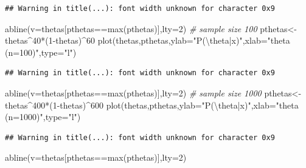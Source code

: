 \documentclass[
]{book}
\newenvironment{Shaded}{\begin{snugshade}}{\end{snugshade}}
\newcommand{\AttributeTok}[1]{\textcolor[rgb]{0.77,0.63,0.00}{#1}}
\newcommand{\CommentTok}[1]{\textcolor[rgb]{0.56,0.35,0.01}{\textit{#1}}}
\newcommand{\DecValTok}[1]{\textcolor[rgb]{0.00,0.00,0.81}{#1}}
\newcommand{\FunctionTok}[1]{\textcolor[rgb]{0.00,0.00,0.00}{#1}}
\newcommand{\NormalTok}[1]{#1}
\newcommand{\OtherTok}[1]{\textcolor[rgb]{0.56,0.35,0.01}{#1}}
\newcommand{\SpecialCharTok}[1]{\textcolor[rgb]{0.00,0.00,0.00}{#1}}
\newcommand{\StringTok}[1]{\textcolor[rgb]{0.31,0.60,0.02}{#1}}
\begin{document}
\begin{verbatim}
## Warning in title(...): font width unknown for character 0x9
\end{verbatim}

\begin{Shaded}
\begin{Highlighting}[]
\FunctionTok{abline}\NormalTok{(}\AttributeTok{v=}\NormalTok{thetas[pthetas}\SpecialCharTok{==}\FunctionTok{max}\NormalTok{(pthetas)],}\AttributeTok{lty=}\DecValTok{2}\NormalTok{)}
\CommentTok{\# sample size 100}
\NormalTok{pthetas}\OtherTok{\textless{}{-}}\NormalTok{thetas}\SpecialCharTok{\^{}}\DecValTok{40}\SpecialCharTok{*}\NormalTok{(}\DecValTok{1}\SpecialCharTok{{-}}\NormalTok{thetas)}\SpecialCharTok{\^{}}\DecValTok{60}
\FunctionTok{plot}\NormalTok{(thetas,pthetas,}\AttributeTok{ylab=}\StringTok{"P(}\SpecialCharTok{\textbackslash{}t}\StringTok{heta|x)"}\NormalTok{,}\AttributeTok{xlab=}\StringTok{"theta  (n=100)"}\NormalTok{,}\AttributeTok{type=}\StringTok{"l"}\NormalTok{)}
\end{Highlighting}
\end{Shaded}

\begin{verbatim}
## Warning in title(...): font width unknown for character 0x9
\end{verbatim}

\begin{Shaded}
\begin{Highlighting}[]
\FunctionTok{abline}\NormalTok{(}\AttributeTok{v=}\NormalTok{thetas[pthetas}\SpecialCharTok{==}\FunctionTok{max}\NormalTok{(pthetas)],}\AttributeTok{lty=}\DecValTok{2}\NormalTok{)}
\CommentTok{\# sample size 1000}
\NormalTok{pthetas}\OtherTok{\textless{}{-}}\NormalTok{thetas}\SpecialCharTok{\^{}}\DecValTok{400}\SpecialCharTok{*}\NormalTok{(}\DecValTok{1}\SpecialCharTok{{-}}\NormalTok{thetas)}\SpecialCharTok{\^{}}\DecValTok{600}
\FunctionTok{plot}\NormalTok{(thetas,pthetas,}\AttributeTok{ylab=}\StringTok{"P(}\SpecialCharTok{\textbackslash{}t}\StringTok{heta|x)"}\NormalTok{,}\AttributeTok{xlab=}\StringTok{"theta  (n=1000)"}\NormalTok{,}\AttributeTok{type=}\StringTok{"l"}\NormalTok{)}
\end{Highlighting}
\end{Shaded}

\begin{verbatim}
## Warning in title(...): font width unknown for character 0x9
\end{verbatim}

\begin{Shaded}
\begin{Highlighting}[]
\FunctionTok{abline}\NormalTok{(}\AttributeTok{v=}\NormalTok{thetas[pthetas}\SpecialCharTok{==}\FunctionTok{max}\NormalTok{(pthetas)],}\AttributeTok{lty=}\DecValTok{2}\NormalTok{)}
\end{Highlighting}
\end{Shaded}
\end{document}
